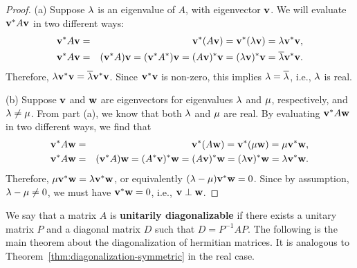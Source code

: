 \begin{proof}
  (a) Suppose $\lambda$ is an eigenvalue of $A$, with eigenvector
  $\vect{v}$. We will evaluate $\vect{v}^{\adjoint}A\vect{v}$ in two
  different ways:
  \begin{eqnarray*}
    \vect{v}^{\adjoint}A\vect{v}
    &=& \vect{v}^{\adjoint}(A\vect{v})
        = \vect{v}^{\adjoint}(\eigenvar\vect{v})
        = \eigenvar\vect{v}^{\adjoint}\vect{v}, \\
    \vect{v}^{\adjoint}A\vect{v}
    &=& (\vect{v}^{\adjoint}A)\vect{v}
        = (\vect{v}^{\adjoint}A^{\adjoint})\vect{v}
        = (A\vect{v})^{\adjoint}\vect{v}
        = (\eigenvar\vect{v})^{\adjoint}\vect{v}
        = \conjugate{\eigenvar}\vect{v}^{\adjoint}\vect{v}.
  \end{eqnarray*}
  Therefore,
  $\eigenvar\vect{v}^{\adjoint}\vect{v} =
  \conjugate{\eigenvar}\vect{v}^{\adjoint}\vect{v}$. Since
  $\vect{v}^{\adjoint}\vect{v}$ is non-zero, this implies
  $\lambda=\overline{\lambda}$, i.e., $\lambda$ is real.

  \noindent
  (b) Suppose $\vect{v}$ and $\vect{w}$ are eigenvectors for
  eigenvalues $\lambda$ and $\mu$, respectively, and
  $\lambda\neq\mu$. From part (a), we know that both
  $\lambda$ and $\mu$ are real.  By evaluating
  $\vect{v}^{\adjoint}A\vect{w}$ in two different ways, we find that
  \begin{eqnarray*}
    \vect{v}^{\adjoint}A\vect{w}
    &=& \vect{v}^{\adjoint}(A\vect{w})
    = \vect{v}^{\adjoint}(\eigenvarB\vect{w})
    = \eigenvarB \vect{v}^{\adjoint}\vect{w},\\
    \vect{v}^{\adjoint}A\vect{w}
    &=& (\vect{v}^{\adjoint}A)\vect{w}
    = (A^{\adjoint}\vect{v})^{\adjoint}\vect{w}
    = (A\vect{v})^{\adjoint}\vect{w}
    = (\eigenvarA\vect{v})^{\adjoint}\vect{w}
    = \eigenvarA\vect{v}^{\adjoint}\vect{w}.
  \end{eqnarray*}
  Therefore,
  $\eigenvarB\vect{v}^{\adjoint}\vect{w} = \eigenvarA\vect{v}^{\adjoint}\vect{w}$, or
  equivalently $(\eigenvarA - \eigenvarB)\vect{v}^{\adjoint}\vect{w} =
  0$. Since by assumption, $\lambda - \mu\neq 0$, we must
  have $\vect{v}^{\adjoint}\vect{w} = 0$, i.e., $\vect{v}\orth\vect{w}$.
\end{proof}

We say that a matrix $A$ is \textbf{unitarily diagonalizable}%
%
%
%
%
 if there exists a unitary
matrix $P$ and a diagonal matrix $D$ such that $D = P^{-1}AP$.  The
following is the main theorem about the diagonalization of hermitian
matrices. It is analogous to
Theorem~\ref{thm:diagonalization-symmetric} in the real case.

